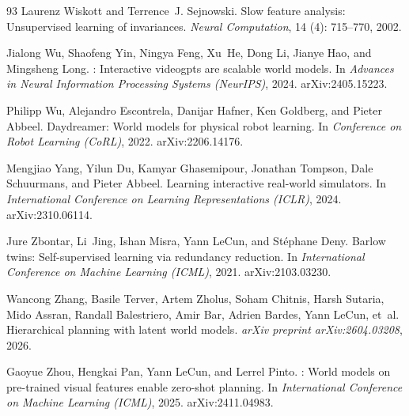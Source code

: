 \begin{thebibliography}{93}
Laurenz Wiskott and Terrence~J. Sejnowski.
\newblock Slow feature analysis: Unsupervised learning of invariances.
\newblock \emph{Neural Computation}, 14 (4): 715--770, 2002.

Jialong Wu, Shaofeng Yin, Ningya Feng, Xu~He, Dong Li, Jianye Hao, and
  Mingsheng Long.
: Interactive videogpts are scalable world models.
\newblock In \emph{Advances in Neural Information Processing Systems
  (NeurIPS)}, 2024.
\newblock arXiv:2405.15223.

Philipp Wu, Alejandro Escontrela, Danijar Hafner, Ken Goldberg, and Pieter
  Abbeel.
\newblock Daydreamer: World models for physical robot learning.
\newblock In \emph{Conference on Robot Learning (CoRL)}, 2022.
\newblock arXiv:2206.14176.

Mengjiao Yang, Yilun Du, Kamyar Ghasemipour, Jonathan Tompson, Dale Schuurmans,
  and Pieter Abbeel.
\newblock Learning interactive real-world simulators.
\newblock In \emph{International Conference on Learning Representations
  (ICLR)}, 2024.
\newblock arXiv:2310.06114.

Jure Zbontar, Li~Jing, Ishan Misra, Yann LeCun, and St{\'e}phane Deny.
\newblock Barlow twins: Self-supervised learning via redundancy reduction.
\newblock In \emph{International Conference on Machine Learning (ICML)}, 2021.
\newblock arXiv:2103.03230.

Wancong Zhang, Basile Terver, Artem Zholus, Soham Chitnis, Harsh Sutaria, Mido
  Assran, Randall Balestriero, Amir Bar, Adrien Bardes, Yann LeCun, et~al.
\newblock Hierarchical planning with latent world models.
\newblock \emph{arXiv preprint arXiv:2604.03208}, 2026.

Gaoyue Zhou, Hengkai Pan, Yann LeCun, and Lerrel Pinto.
: World models on pre-trained visual features enable
  zero-shot planning.
\newblock In \emph{International Conference on Machine Learning (ICML)}, 2025.
\newblock arXiv:2411.04983.

\end{thebibliography}
